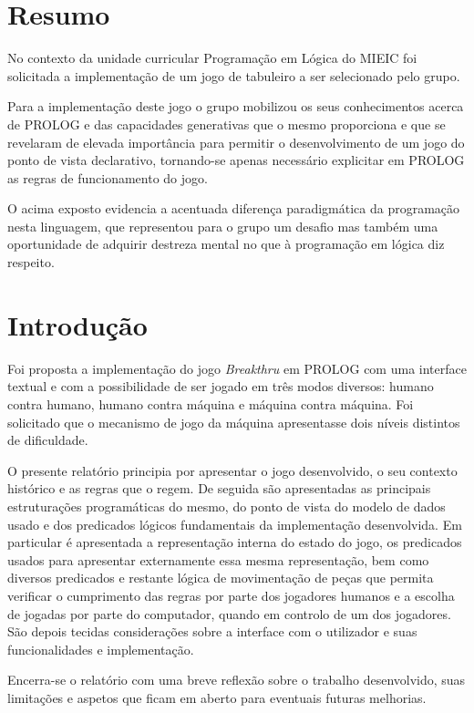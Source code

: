 \documentclass[a4paper]{article}
\begin{document}
\section{Resumo}
No contexto da unidade curricular Programação em Lógica do MIEIC foi solicitada a implementação de um jogo de tabuleiro a ser selecionado pelo grupo.

Para a implementação deste jogo o grupo mobilizou os seus conhecimentos acerca de PROLOG e das capacidades generativas que o mesmo proporciona e que se revelaram de elevada importância para permitir o desenvolvimento de um jogo do ponto de vista declarativo, tornando-se apenas necessário explicitar em PROLOG as regras de funcionamento do jogo.

O acima exposto evidencia a acentuada diferença paradigmática da programação nesta linguagem, que representou para o grupo um desafio mas também uma oportunidade de adquirir destreza mental no que à programação em lógica diz respeito.



\tableofcontents
\newpage

\section{Introdução}
Foi proposta a implementação do jogo \textit{Breakthru} em PROLOG com uma interface textual e com a possibilidade de ser jogado em três modos diversos: humano contra humano, humano contra máquina e máquina contra máquina. Foi solicitado que o mecanismo de jogo da máquina apresentasse dois níveis distintos de dificuldade.

O presente relatório principia por apresentar o jogo desenvolvido, o seu contexto histórico e as regras que o regem. De seguida são apresentadas as principais estruturações programáticas do mesmo, do ponto de vista do modelo de dados usado e dos predicados lógicos fundamentais da implementação desenvolvida. Em particular é apresentada a representação interna do estado do jogo, os predicados usados para apresentar externamente essa mesma representação, bem como diversos predicados e restante lógica de movimentação de peças que permita verificar o cumprimento das regras por parte dos jogadores humanos e a escolha de jogadas por parte do computador, quando em controlo de um dos jogadores. São depois tecidas considerações sobre a interface com o utilizador e suas funcionalidades e implementação.

Encerra-se o relatório com uma breve reflexão sobre o trabalho desenvolvido, suas limitações e aspetos que ficam em aberto para eventuais futuras melhorias.
\end{document}
